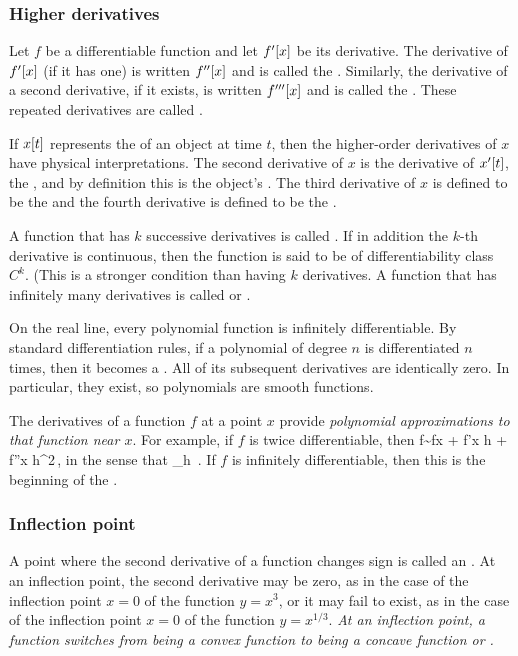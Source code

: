 \subsubsection{Higher derivatives}
Let $f$ be a differentiable function and let $f'\!\left[{x}\right]$ be its derivative. The derivative of $f'\!\left[{x}\right]$ (if it has one) is written $f''\!\left[{x}\right]$ and is called the . Similarly, the derivative of a second derivative, if it exists, is written $f'''\!\left[{x}\right]$ and is called the . These repeated derivatives are called .

If $x\!\left[{t}\right]$ represents the  of an object at time $t$, then the higher-order derivatives of $x$ have physical interpretations. The second derivative of $x$ is the derivative of $x'\!\left[{t}\right]$, the , and by definition this is the object's . The third derivative of $x$ is defined to be the  and the fourth derivative is defined to be the .

A function that has $k$ successive derivatives is called . If in addition the $k$-th derivative is continuous, then the function is said to be of differentiability class $C^k$. (This is a stronger condition than having $k$ derivatives. A function that has infinitely many derivatives is called  or .

On the real line, every polynomial function is infinitely differentiable. By standard differentiation rules, if a polynomial of degree $n$ is differentiated $n$ times, then it becomes a . All of its subsequent derivatives are identically zero. In particular, they exist, so polynomials are smooth functions.

The derivatives of a function $f$ at a point $x$ provide \emph{polynomial approximations to that function near $x$}. For example, if $f$ is twice differentiable, then
\beq
f\sim f\vat x + f'\vat x h +  f''\vat x h^2\,,
\eeq
in the sense that
\beq
\lim_{h} \,.
\eeq
If $f$ is infinitely differentiable, then this is the beginning of the .


\subsubsection{Inflection point}
A point where the second derivative of a function changes sign is called an . At an inflection point, the second derivative may be zero, as in the case of the inflection point $x=0$ of the function $y=x^3$, or it may fail to exist, as in the case of the inflection point $x=0$ of the function $y=x^{1/3}$. \emph{At an inflection point, a function switches from being a convex function to being a concave function or \vis.}


